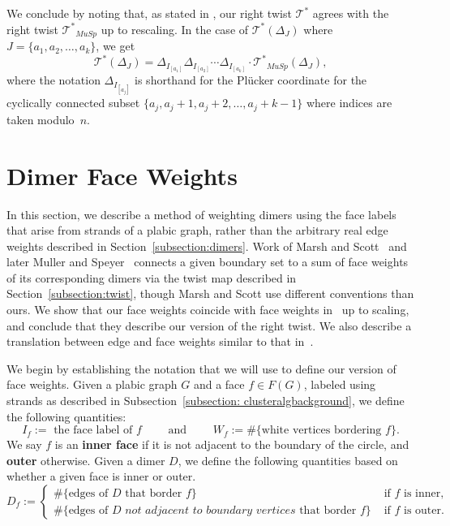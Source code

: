 \documentclass[11pt]{article}
\theoremstyle{definition}
\numberwithin{equation}{section}
\def\T {{\mathscr{T}^*}}
\numberwithin{equation}{section}
\begin{document}
We conclude by noting that, as stated in \cite[Remark 6.3]{mullerspeyer}, our right twist $\T$ agrees with the right twist $\T_{MuSp}$ up to rescaling. In the case of $\T(\Delta_J)$ where $J = \{a_1,a_2,\dots, a_k\}$, we get
\begin{equation}\label{eq:musprmk}
    \T(\Delta_J) = \Delta_{I_{[a_1]}}\Delta_{I_{[a_2]}}\cdots \Delta_{I_{[a_k]}} \cdot \T_{MuSp}(\Delta_J),
\end{equation}
where the notation $\Delta_{I_{[a_j]}}$ is shorthand for the Pl\"ucker coordinate for the cyclically connected subset $\{a_j, a_j+1, a_j+2, \dots, a_j + k-1\}$ where indices are taken modulo~$n$.

\section{Dimer Face Weights}\label{section:facewts}
In this section, we describe a method of weighting dimers using the face labels that arise from strands of a plabic graph, rather than the arbitrary real edge weights described in Section~\ref{subsection:dimers}. Work of Marsh and Scott~\cite{marshscott2016} and later Muller and Speyer~\cite{mullerspeyer} connects a given boundary set to a sum of face weights of its corresponding dimers via the twist map described in Section~\ref{subsection:twist}, though Marsh and Scott use different conventions than ours. We show that our face weights coincide with face weights in~\cite{mullerspeyer} up to scaling, and conclude that they describe our version of the right twist. We also describe a translation between edge and face weights similar to that in~\cite{marshscott2016}.

We begin by establishing the notation that we will use to define our version of face weights. 
Given a plabic graph $G$ and a face $f \in F(G)$, labeled using strands as described in Subsection~\ref{subsection: clusteralgbackground}, we define the following quantities:
$$I_f := \text{ the face label of } f \hspace{2em} \text{ and } \hspace{2em} W_f := \#\{\text{white vertices bordering } f\}.$$
We say $f$ is an \textbf{inner face} if it is not adjacent to the boundary of the circle, and \textbf{outer} otherwise. Given a dimer $D$, we define the following quantities based on whether a given face is inner or outer. 
{\small $$D_f := \begin{cases}
    \#\{\text{edges of } D \text{ that border } f\} &\text{ if } f \text{ is inner},\\
    \#\{\text{edges of } D \textit{ not adjacent to boundary vertices}\text{ that border } f\} &\text{ if } f \text{ is outer}.
\end{cases}$$}
\end{document}
